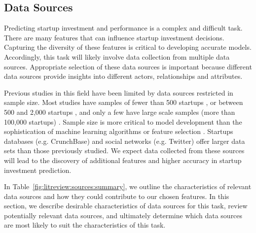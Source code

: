 \documentclass[../thesis/thesis.tex]{subfiles}
\begin{document}
\begin{refsection}
\section{Data Sources}

Predicting startup investment and performance is a complex and difficult task. There are many features that can influence startup investment decisions. Capturing the diversity of these features is critical to developing accurate models. Accordingly, this task will likely involve data collection from multiple data sources. Appropriate selection of these data sources is important because different data sources provide insights into different actors, relationships and attributes.

Previous studies in this field have been limited by data sources restricted in sample size. Most studies have samples of fewer than 500 startups \cite{ahlers2015, gimmon2010}, or between 500 and 2,000 startups \cite{hoenen2014, yu2015, an2015, werth2013, croce2016}, and only a few have large scale samples (more than 100,000 startups) \cite{shan2014, cheng2016}. Sample size is more critical to model development than the sophistication of machine learning algorithms or feature selection \cite{caruana2008}. Startups databases (e.g. CrunchBase) and social networks (e.g. Twitter) offer larger data sets than those previously studied. We expect data collected from these sources will lead to the discovery of additional features and higher accuracy in startup investment prediction.

In Table~\ref{fig:litreview:sources:summary}, we outline the characteristics of relevant data sources and how they could contribute to our chosen features. In this section, we describe desirable characteristics of data sources for this task, review potentially relevant data sources, and ultimately determine which data sources are most likely to suit the characteristics of this task.



\end{refsection}
\end{document}
